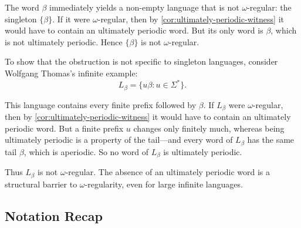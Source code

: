 \begin{example}
The word $\beta$ immediately yields a non-empty language that is not
$\omega$-regular: the singleton $\{\beta\}$.  If it were
$\omega$-regular, then by \cref{cor:ultimately-periodic-witness} it would
have to contain an ultimately periodic word.  But its only word is
$\beta$, which is not ultimately periodic.  Hence $\{\beta\}$ is not
$\omega$-regular.

To show that the obstruction is not specific to singleton languages,
consider Wolfgang Thomas's infinite example:
\[
  L_\beta = \{ u\beta : u\in\Sigma^* \}.
\]

\begin{center}
\end{center}

This language contains every finite prefix followed by $\beta$.  If
$L_\beta$ were $\omega$-regular, then by
\cref{cor:ultimately-periodic-witness} it would have to contain an
ultimately periodic word.  But a finite prefix $u$ changes only finitely
much, whereas being ultimately periodic is a property of the tail---and
every word of $L_\beta$ has the same tail $\beta$, which is aperiodic.  So
no word of $L_\beta$ is ultimately periodic.

Thus $L_\beta$ is not $\omega$-regular.  The absence of an ultimately
periodic word is a structural barrier to $\omega$-regularity, even for
large infinite languages.
\end{example}

\subsection*{Notation Recap}

